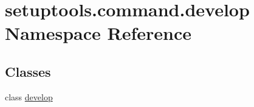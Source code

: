 \hypertarget{namespacesetuptools_1_1command_1_1develop}{}\section{setuptools.\+command.\+develop Namespace Reference}
\label{namespacesetuptools_1_1command_1_1develop}
\subsection*{Classes}
\begin{DoxyCompactItemize}
\item 
class \hyperlink{classsetuptools_1_1command_1_1develop_1_1develop}{develop}
\end{DoxyCompactItemize}
